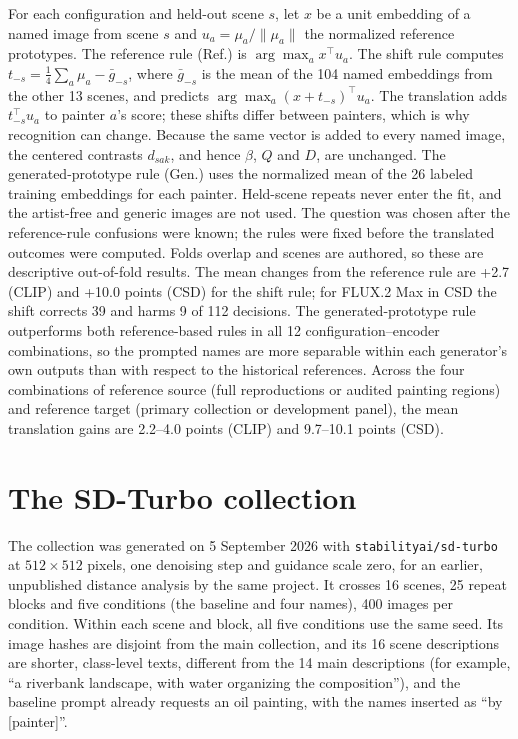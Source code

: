For each configuration and held-out scene $s$, let $x$ be a unit embedding of a named image
from scene $s$ and $u_a=\mu_a/\|\mu_a\|$ the normalized reference prototypes. The reference rule
(Ref.) is $\arg\max_a x^\top u_a$. The shift rule computes $t_{-s}=\frac14\sum_a\mu_a-\bar
g_{-s}$, where $\bar g_{-s}$ is the mean of the 104 named embeddings from the other 13 scenes,
and predicts $\arg\max_a(x+t_{-s})^\top u_a$. The translation adds $t_{-s}^\top u_a$ to painter
$a$'s score; these shifts differ between painters, which is why recognition can change. Because the
same vector is added to every named image, the centered contrasts $d_{sak}$, and hence $\beta$, $Q$
and $D$, are unchanged. The generated-prototype rule (Gen.) uses the normalized mean of the 26
labeled training embeddings for each painter. Held-scene repeats never enter the fit, and the
artist-free and generic images are not used. The question was chosen after the reference-rule
confusions were known; the rules were fixed before the translated outcomes were computed. Folds
overlap and scenes are authored, so these are descriptive out-of-fold results. The mean changes
from the reference rule are +2.7 (CLIP) and +10.0 points (CSD) for the shift rule; for FLUX.2 Max in
CSD the shift corrects 39 and harms 9 of 112 decisions. The generated-prototype rule outperforms
both reference-based rules in all 12 configuration--encoder combinations, so the prompted names
are more separable within each generator's own outputs than with respect to the historical
references. Across the four
combinations of reference source (full reproductions or audited painting regions) and reference
target (primary collection or development panel), the mean translation gains are 2.2--4.0 points
(CLIP) and 9.7--10.1 points (CSD).

\FloatBarrier
\section{The SD-Turbo collection}\label{app:sdturbo}

The collection was generated on 5 September 2026 with \texttt{stabilityai/sd-turbo} at
$512\times512$ pixels, one denoising step and guidance scale zero, for an earlier, unpublished
distance analysis by the same project. It crosses 16 scenes, 25 repeat blocks and five
conditions (the baseline and four names), 400 images per condition. Within each scene and
block, all five conditions use the same seed. Its image hashes are disjoint from the main
collection, and its 16 scene descriptions are shorter, class-level texts, different from the 14
main descriptions (for example, ``a riverbank landscape, with water organizing the
composition''), and the baseline prompt already requests an oil painting, with the names inserted
as ``by [painter]''.

